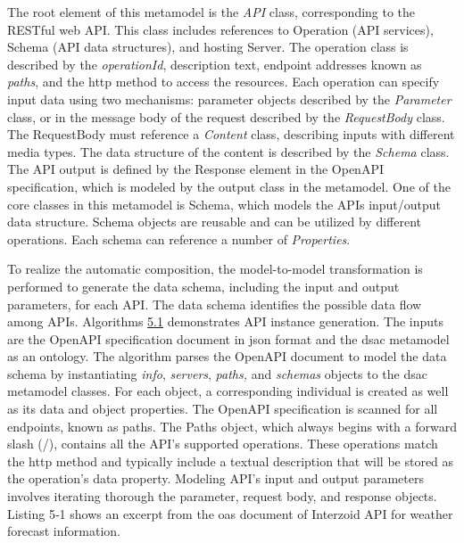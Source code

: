 The root element of this metamodel is the \emph{API} class,
corresponding to the RESTful web API. This class includes references to
Operation (API services), Schema (API data structures), and hosting
Server. The operation class is described by the \emph{operationId},
description text, endpoint addresses known as \emph{paths}, and the \gls{http}
method to access the resources. Each operation can specify input data
using two mechanisms: parameter objects described by the
\emph{Parameter} class, or in the message body of the request described
by the \emph{RequestBody} class. The RequestBody must reference a
\emph{Content} class, describing inputs with different media types. The
data structure of the content is described by the \emph{Schema} class.
The API output is defined by the Response element in the OpenAPI
specification, which is modeled by the output class in the metamodel.
One of the core classes in this metamodel is Schema, which models the
API\textquotesingle s input/output data structure. Schema objects are
reusable and can be utilized by different operations. Each schema can
reference a number of \emph{Properties}.

To realize the automatic composition, the model-to-model transformation
is performed to generate the data schema, including the input and output
parameters, for each API. The data schema identifies the possible data
flow among APIs. Algorithms \hyperref[Algorithm5]{5.1} demonstrates API
instance generation. The inputs are the OpenAPI specification document
in \gls{json} format and the \gls{dsac} metamodel as an ontology. The algorithm
parses the OpenAPI document to model the data schema by instantiating
\emph{info}, \emph{servers}, \emph{paths,} and \emph{schemas} objects to
the \gls{dsac} metamodel classes. For each object, a corresponding individual
is created as well as its data and object properties. The OpenAPI
specification is scanned for all endpoints, known as paths. The Paths
object, which always begins with a forward slash (/), contains all the
API's supported operations. These operations match the \gls{http} method and
typically include a textual description that will be stored as the
operation's data property. Modeling API's input and output parameters
involves iterating thorough the parameter, request body, and response
objects. Listing 5‑1 shows an excerpt from the \gls{oas}
document of Interzoid API for weather forecast information.

